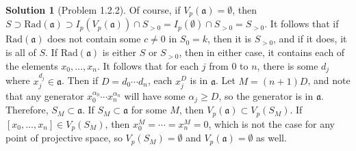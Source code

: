 \documentclass[aps,pra,showpacs,notitlepage,onecolumn,superscriptaddress,nofootinbib]{revtex4-1}
\theoremstyle{definition}
\newtheorem{solution}{Solution}[section]
\begin{document}
\begin{solution}[Problem 1.2.2]
Of course, if $V_p(\mathfrak{a}) = \emptyset$, then $S \supset \text{Rad}(\mathfrak{a}) \supset I_p(V_p(\mathfrak{a})) \cap S_{> 0} = I_p(\emptyset) \cap S_{> 0} = S_{> 0}$.
It follows that if $\text{Rad}(\mathfrak{a})$ does not contain some $c \neq 0$ in $S_0 = k$, then it is $S_{> 0}$, and if it does, it is all of $S$. If $\text{Rad}(\mathfrak{a})$ is either $S$ or
$S_{> 0}$, then in either case, it contains each of the elements $x_0, \dots, x_{n}$. It follows that for each $j$ from $0$ to $n$, there is some $d_j$ where $x_j^{d_j} \in \mathfrak{a}$. Then if $D = d_0 \cdots d_n$,
each $x_j^{D}$ is in $\mathfrak{a}$. Let $M = (n + 1) D$, and note that any generator $x_0^{\alpha_0} \cdots x_n^{\alpha_n}$ will have some $\alpha_j \geq D$, so the generator is in $\mathfrak{a}$. Therefore, $S_M \subset \mathfrak{a}$.
If $S_M \subset \mathfrak{a}$ for some $M$, then $V_p(\mathfrak{a}) \subset V_p(S_M)$. If $[x_0, \dots, x_n] \in V_p(S_M)$, then $x_0^M = \cdots = x_n^M = 0$, which is not the case for any point of projective space, so $V_p(S_M) = \emptyset$
and $V_p(\mathfrak{a}) = \emptyset$ as well.
\end{solution}
\end{document}

